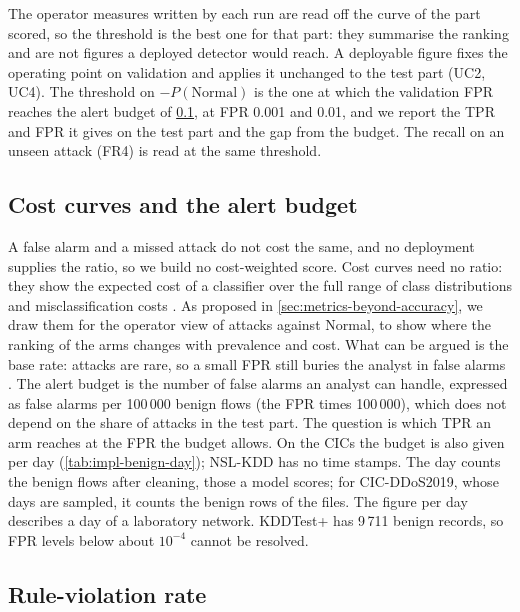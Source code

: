 The operator measures written by each run are read off the curve of the part scored, so the
threshold is the best one for that part: they summarise the ranking and are not figures a
deployed detector would reach. A deployable figure fixes the operating point on validation and
applies it unchanged to the test part (UC2, UC4). The threshold on $-P(\text{Normal})$ is the one
at which the validation FPR reaches the alert budget of \cref{sec:alert-budget}, at FPR 0.001 and 0.01,
and we report the TPR and FPR it gives on the test part and the gap from the budget. The recall on an
unseen attack (FR4) is read at the same threshold.

\subsection{Cost curves and the alert budget}
\label{sec:alert-budget}

A false alarm and a missed attack do not cost the same, and no deployment supplies the ratio,
so we build no cost-weighted score. Cost curves need no ratio: they show the expected cost of a
classifier over the full range of class distributions and misclassification costs
\citep{drummond2006cost}. As proposed in \cref{sec:metrics-beyond-accuracy}, we draw them for the
operator view of attacks against Normal, to show where the ranking of the arms changes with
prevalence and cost.
What can be argued is the base rate: attacks are rare, so a small FPR still
buries the analyst in false alarms \citep{axelsson2000baserate}. The alert budget is the number
of false alarms an analyst can handle, expressed as false alarms per 100\,000 benign flows (the
FPR times 100\,000), which does not depend on the share of attacks in the test part. The
question is which TPR an arm reaches at the FPR the budget allows. On the CICs the budget is
also given per day (\cref{tab:impl-benign-day}); NSL-KDD has no time stamps. The day counts the
benign flows after cleaning, those a model scores; for CIC-DDoS2019, whose days are sampled, it
counts the benign rows of the files. The figure per day describes a day of a laboratory network.
KDDTest+ has 9\,711 benign records, so FPR levels below about $10^{-4}$ cannot be resolved.

\subsection{Rule-violation rate}
\label{sec:rule-violation-rate}


